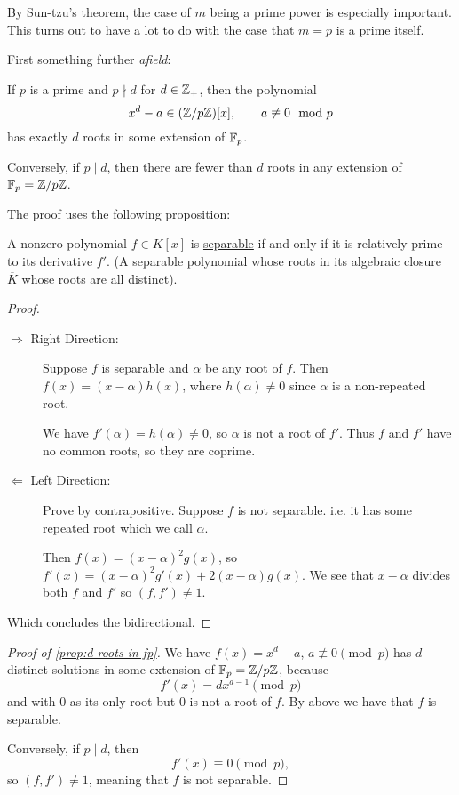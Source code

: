 By Sun-tzu's theorem, the case of $m$ being a prime power is especially important. This turns out to have a lot to do with the case that $m=p$ is a prime itself.

First something further \emph{afield}:
\begin{proposition}\label{prop:d-roots-in-fp}
    If $p$ is a prime and $p\nmid d$ for $d\in\mathbb Z_+$, then the polynomial
    \[x^d - a\in (\mathbb Z/p\mathbb Z)[x],\qquad a\not\equiv 0\mod{p}\]
    has exactly $d$ roots in some extension of $\mathbb F_p$.

    Conversely, if $p\mid d$, then there are fewer than $d$ roots in any extension of $\mathbb F_p = \mathbb Z/p\mathbb Z$.
\end{proposition}

The proof uses the following proposition:
\begin{proposition*}
    A nonzero polynomial $f\in K[x]$ is \ul{separable} if and only if it is relatively prime to its derivative $f'$. (A separable polynomial whose roots in its algebraic closure $\overline{K}$ whose roots are all distinct).
\end{proposition*}
\begin{proof}
    ~\begin{description}
        \item[$\Rightarrow$ Right Direction:]
        Suppose $f$ is separable and $\alpha$ be any root of $f$. Then $f(x) = (x-\alpha)h(x)$, where $h(\alpha)\neq 0$ since $\alpha$ is a non-repeated root. 
        
        We have $f'(\alpha) = h(\alpha)\neq 0$, so $\alpha$ is not a root of $f'$. Thus $f$ and $f'$ have no common roots, so they are coprime. 

        \item[$\Leftarrow$ Left Direction:]
        Prove by contrapositive. Suppose $f$ is not separable. i.e. it has some repeated root which we call $\alpha$. 
        
        Then $f(x) = (x-\alpha)^2g(x)$, so $f'(x) = (x-\alpha)^2 g'(x) + 2(x-\alpha)g(x)$. We see that $x-\alpha$ divides both $f$ and $f'$ so $(f, f')\neq 1$. 
    \end{description}
    Which concludes the bidirectional. 
\end{proof}
\begin{proof}[Proof of \cref{prop:d-roots-in-fp}]
    We have $f(x) = x^d - a$, $a\not\equiv 0\pmod{p}$ has $d$ distinct solutions in some extension of $\mathbb F_p = \mathbb Z/p\mathbb Z$, because \[f'(x) = dx^{d-1}\pmod{p}\] and with $0$ as its only root but $0$ is not a root of $f$. By above we have that $f$ is separable. 

    Conversely, if $p\mid d$, then 
    \[f'(x)\equiv 0\pmod{p},\]
    so $(f, f')\neq 1$, meaning that $f$ is not separable. 
\end{proof}

